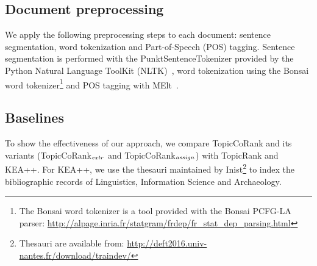     \subsection{Document preprocessing}
    \label{subsec:document_preprocessing}
        We apply the following preprocessing steps to each document: sentence segmentation, word tokenization and Part-of-Speech (POS) tagging.
        Sentence segmentation is performed with the PunktSentenceTokenizer provided by the Python Natural Language ToolKit (NLTK)~\cite{bird2009nltk}, word tokenization using the Bonsai word tokenizer\footnote{The Bonsai word tokenizer is a tool provided with the Bonsai PCFG-LA parser: \url{http://alpage.inria.fr/statgram/frdep/fr_stat_dep_parsing.html}} and POS tagging with MElt~\cite{denis2009melt}.

    \subsection{Baselines}
    \label{subsec:baselines}
        To show the effectiveness of our approach, we compare TopicCoRank and its variants (TopicCoRank$_\textnormal{\textit{extr}}$ and TopicCoRank$_\textnormal{\textit{assign}}$) with TopicRank and KEA++.
        For KEA++, we use the thesauri maintained by Inist\footnote{Thesauri are available from: \url{http://deft2016.univ-nantes.fr/download/traindev/}} to index the bibliographic records of Linguistics, Information Science and Archaeology.
    
    

